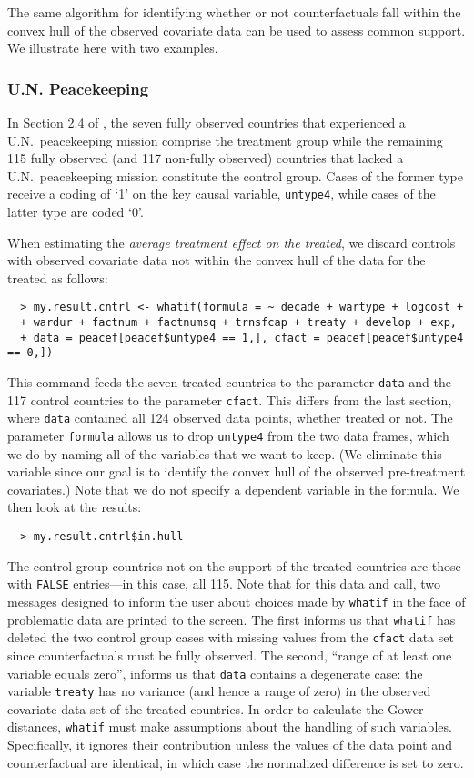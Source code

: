 \documentclass[oneside,letterpaper,titlepage]{article}
\begin{document}
The same algorithm for identifying whether or not counterfactuals
fall within the convex hull of the observed covariate data can be used
to assess common support.  We illustrate here with two examples.

\subsubsection{U.N. Peacekeeping}

In Section 2.4 of \citet{KinZen07}, the seven fully observed countries
that experienced a U.N.\ peacekeeping mission comprise the treatment
group while the remaining 115 fully observed (and 117 non-fully
observed) countries that lacked a U.N.\ peacekeeping mission
constitute the control group.  Cases of the former type receive a
coding of `1' on the key causal variable, \texttt{untype4}, while
cases of the latter type are coded `0'.

When estimating the \emph{average treatment effect on the treated}, we
discard controls with observed covariate data not within the convex
hull of the data for the treated as follows:
  \begin{verbatim}
  > my.result.cntrl <- whatif(formula = ~ decade + wartype + logcost +  
  + wardur + factnum + factnumsq + trnsfcap + treaty + develop + exp, 
  + data = peacef[peacef$untype4 == 1,], cfact = peacef[peacef$untype4 == 0,])
  \end{verbatim}
This command feeds the seven treated countries to the parameter
\texttt{data} and the 117 control countries to the parameter
\texttt{cfact}.  This differs from the last section, where
\texttt{data} contained all 124 observed data points, whether treated
or not.  The parameter \texttt{formula} allows us to drop \texttt{untype4}
from the two data frames, which we do by naming all of the variables
that we want to keep.  (We eliminate this variable since our goal is
to identify the convex hull of the observed pre-treatment covariates.)
Note that we do not specify a dependent variable in the formula.  We
then look at the results:
  \begin{verbatim}
  > my.result.cntrl$in.hull
  \end{verbatim} %
The control group countries not on the support of the treated
countries are those with \texttt{FALSE} entries---in this case, all
115.  Note that for this data and call, two messages designed to
inform the user about choices made by \texttt{whatif} in the face of
problematic data are printed to the screen.  The first informs us that
\texttt{whatif} has deleted the two control group cases with missing
values from the \texttt{cfact} data set since counterfactuals must be
fully observed.  The second, ``range of at least one variable equals
zero'', informs us that \texttt{data} contains a degenerate case: the
variable \texttt{treaty} has no variance (and hence a range of zero)
in the observed covariate data set of the treated countries.  In order
to calculate the Gower distances, \texttt{whatif} must make
assumptions about the handling of such variables.  Specifically, it
ignores their contribution unless the values of the data point and
counterfactual are identical, in which case the normalized difference
is set to zero.
\end{document}

